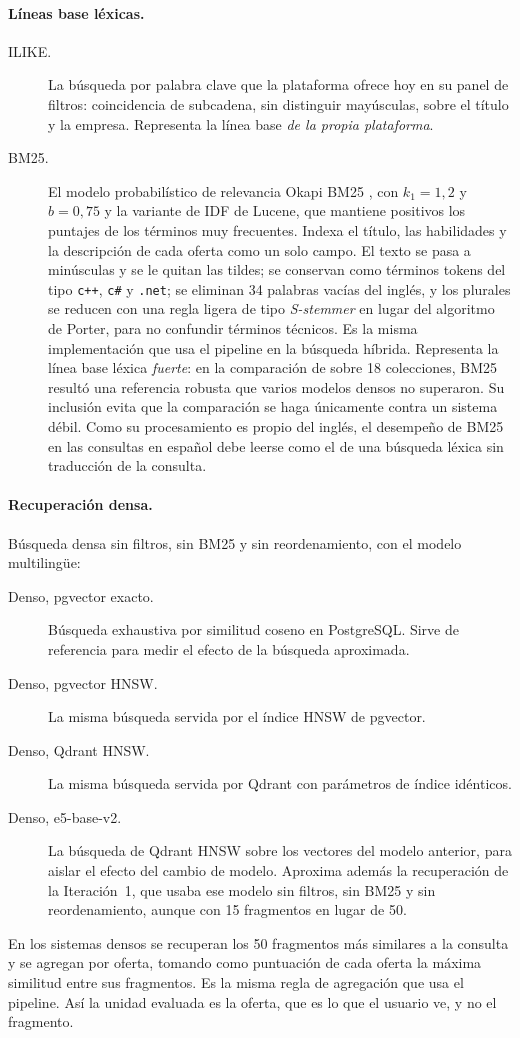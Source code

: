 \paragraph{Líneas base léxicas.}
\begin{description}
    \item[ILIKE.] La búsqueda por palabra clave que la plataforma ofrece hoy en su panel de filtros: coincidencia de subcadena, sin distinguir mayúsculas, sobre el título y la empresa. Representa la línea base \emph{de la propia plataforma}.
    \item[BM25.] El modelo probabilístico de relevancia Okapi BM25 \citep{Robertson2009}, con $k_1 = 1{,}2$ y $b = 0{,}75$ y la variante de IDF de Lucene, que mantiene positivos los puntajes de los términos muy frecuentes. Indexa el título, las habilidades y la descripción de cada oferta como un solo campo. El texto se pasa a minúsculas y se le quitan las tildes; se conservan como términos tokens del tipo \texttt{c++}, \texttt{c\#} y \texttt{.net}; se eliminan 34 palabras vacías del inglés, y los plurales se reducen con una regla ligera de tipo \textit{S-stemmer} en lugar del algoritmo de Porter, para no confundir términos técnicos. Es la misma implementación que usa el pipeline en la búsqueda híbrida. Representa la línea base léxica \emph{fuerte}: en la comparación de \citet{Thakur2021} sobre 18 colecciones, BM25 resultó una referencia robusta que varios modelos densos no superaron. Su inclusión evita que la comparación se haga únicamente contra un sistema débil. Como su procesamiento es propio del inglés, el desempeño de BM25 en las consultas en español debe leerse como el de una búsqueda léxica sin traducción de la consulta.
\end{description}

\paragraph{Recuperación densa.} Búsqueda densa sin filtros, sin BM25 y sin reordenamiento, con el modelo multilingüe:
\begin{description}
    \item[Denso, pgvector exacto.] Búsqueda exhaustiva por similitud coseno en PostgreSQL. Sirve de referencia para medir el efecto de la búsqueda aproximada.
    \item[Denso, pgvector HNSW.] La misma búsqueda servida por el índice HNSW de pgvector.
    \item[Denso, Qdrant HNSW.] La misma búsqueda servida por Qdrant con parámetros de índice idénticos.
    \item[Denso, e5-base-v2.] La búsqueda de Qdrant HNSW sobre los vectores del modelo anterior, para aislar el efecto del cambio de modelo. Aproxima además la recuperación de la Iteración~1, que usaba ese modelo sin filtros, sin BM25 y sin reordenamiento, aunque con 15 fragmentos en lugar de 50.
\end{description}
En los sistemas densos se recuperan los 50 fragmentos más similares a la consulta y se agregan por oferta, tomando como puntuación de cada oferta la máxima similitud entre sus fragmentos. Es la misma regla de agregación que usa el pipeline. Así la unidad evaluada es la oferta, que es lo que el usuario ve, y no el fragmento.

